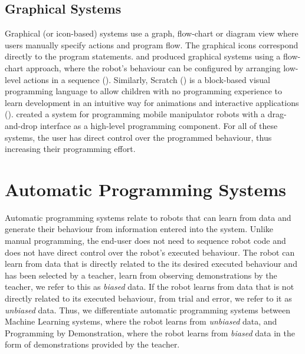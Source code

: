 \subsection{Graphical Systems}\label{sssec:Graphical systems}
Graphical (or icon-based) systems use a graph, flow-chart or diagram view where users manually specify actions and program flow.
The graphical icons correspond directly to the program statements.
\cite{lego2003} and \cite{bischoff2002morpha} produced graphical systems using a flow-chart approach, where the robot's behaviour can be configured by arranging low-level actions in a sequence ().
Similarly, Scratch (\cite{majed2014learn}) is a block-based visual programming language to allow children with no programming experience to learn development in an intuitive way for animations and interactive applications ().
\cite{huang2017code3} created a system for programming mobile manipulator robots with a drag-and-drop interface as a high-level programming component.
For all of these systems, the user has direct control over the programmed behaviour, thus increasing their programming effort.

\section{Automatic Programming Systems}\label{subsec:Automatic Programming Systems}
Automatic programming systems relate to robots that can learn from data and generate their behaviour from information entered into the system.
Unlike manual programming, the end-user does not need to sequence robot code and does not have direct control over the robot's executed behaviour.
The robot can learn from data that is directly related to the its desired executed behaviour and has been selected by a teacher, \eg learn from observing demonstrations by the teacher, we refer to this as \textit{biased} data.
If the robot learns from data that is not directly related to its executed behaviour, \eg from trial and error, we refer to it as \textit{unbiased} data.
Thus, we differentiate automatic programming systems between Machine Learning systems, where the robot learns from \textit{unbiased} data, and Programming by Demonstration, where the robot learns from \textit{biased} data in the form of demonstrations provided by the teacher.

